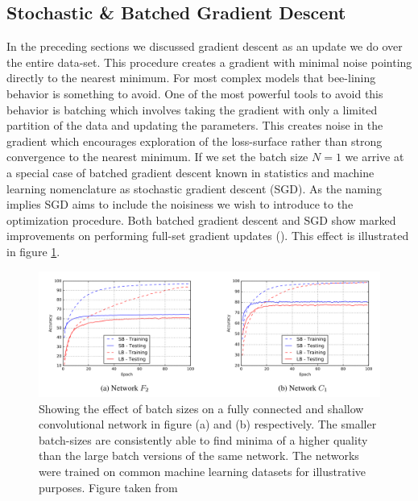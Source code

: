\subsection{Stochastic \& Batched Gradient Descent}
In the preceding sections we discussed gradient descent as an update we do over the entire data-set. This procedure creates a gradient with minimal noise pointing directly to the nearest minimum. For most complex models that bee-lining behavior is something to avoid. One of the most powerful tools to avoid this behavior is batching which involves taking the gradient with only a limited partition of the data and updating the parameters. This creates noise in the gradient which encourages exploration of the loss-surface rather than strong convergence to the nearest minimum. If we set the batch size $N=1$ we arrive at a special case of batched gradient descent known in statistics and machine learning nomenclature as stochastic gradient descent (SGD). As the naming implies SGD aims to include the noisiness we wish to introduce to the optimization procedure. Both batched gradient descent and SGD show marked improvements on performing full-set gradient updates (\cite{Keskar2016}). This effect is illustrated in figure \ref{fig:batch_size}. 

\begin{figure}[H]
\centering
\includegraphics[width=\textwidth]{../figures/batch_size_plots}
\caption{Showing the effect of batch sizes on a fully connected and shallow convolutional network in figure (a) and (b) respectively. The smaller batch-sizes are consistently able to find minima of a higher quality than the large batch versions of the same network. The networks were trained on common machine learning datasets for illustrative purposes. Figure taken from \citet{Keskar2016} }\label{fig:batch_size}
\end{figure}

